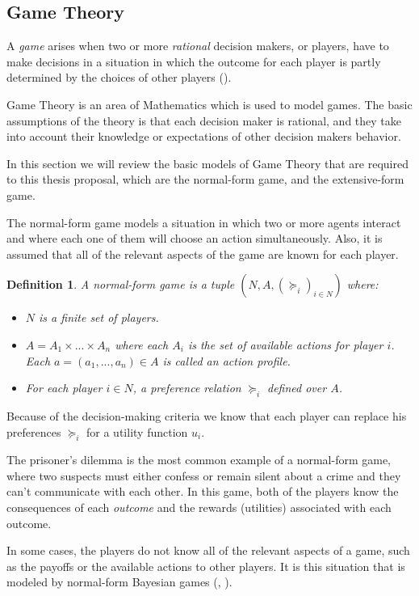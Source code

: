 \documentclass[11pt]{article}
\theoremstyle{plain}
\newtheorem{defi}[teo]{Definition}
\begin{document}
	\subsection{Game Theory}
	A \textit{game} arises when two or more \textit{rational} decision makers, or players, have to make decisions in a situation in which the outcome for each player is partly determined by the choices of other players (\cite{binmore2008rational}).
	
	Game Theory is an area of Mathematics which is used to model games. The basic assumptions of the theory is that each decision maker is rational, and they take into account their knowledge or expectations of other decision makers behavior.
	
	In this section we will review the basic models of Game Theory that are required to this thesis proposal, which are the normal-form game, and the extensive-form game. 
	
	The normal-form game models a situation in which two or more agents interact and where each one of them will choose an action simultaneously. Also, it is assumed that all of the relevant aspects of the game are known for each player.
	
	\begin{defi}
	A normal-form game is a tuple $(N,A,(\succeq_i)_{i \in N})$ where:
	\begin{itemize}
	\item $N$ is a finite set of players.
	\item $A=A_1 \times ... \times A_n$ where each $A_i$ is the set of available actions for player $i$. Each $a=(a_1,...,a_n) \in A$ is called an action profile.
	\item For each player $i \in N$, a preference relation $\succeq_i$ defined over $A$.
	\end{itemize}
	\end{defi}

Because of the decision-making criteria we know that each player can replace his preferences $\succeq_i$ for a utility function $u_i$.

The prisoner's dilemma is the most common example of a normal-form game, where two suspects must either confess or remain silent about a crime and they can't communicate with each other. In this game, both of the players know the consequences of each \textit{outcome} and the rewards (utilities) associated with each outcome.

In some cases, the players do not know all of the relevant aspects of a game, such as the payoffs or the available actions to other players. It is this situation that is modeled by normal-form Bayesian games (\cite{osborne1994course}, \cite{shoham2008multiagent}).
\end{document}
